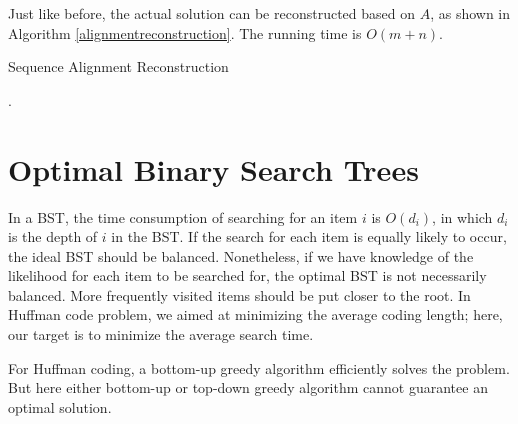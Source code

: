 Just like before, the actual solution can be reconstructed based on $A$, as shown in Algorithm \ref{alignmentreconstruction}. The running time is $O(m+n)$.
\begin{algorithm}[ht]
\caption{Sequence Alignment Reconstruction}\label{alignmentreconstruction}
\begin{algorithmic}[1]
.
\Else{}
\EndIf\EndWhile
\end{algorithmic}
\end{algorithm}
\section{Optimal Binary Search Trees}
In a BST, the time consumption of searching for an item $i$ is $O(d_i)$, in which $d_i$ is the depth of $i$ in the BST. If the search for each item is equally likely to occur, the ideal BST should be balanced. Nonetheless, if we have knowledge of the likelihood for each item to be searched for, the optimal BST is not necessarily balanced. More frequently visited items should be put closer to the root. In Huffman code problem, we aimed at minimizing the average coding length; here, our target is to minimize the average search time.
\begin{description}
\end{description}
For Huffman coding, a bottom-up greedy algorithm efficiently solves the problem. But here either bottom-up or top-down greedy algorithm cannot guarantee an optimal solution.

